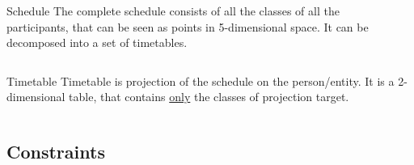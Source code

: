 \begin{frame}
  \begin{columns}
    \begin{column}{4cm}
      \begin{block}{Schedule}
        The complete schedule consists of all the classes of all the participants,
        that can be seen as points in 5-dimensional space. It can be decomposed
        into a set of \alert{timetables}.
      \end{block}
    \end{column}
    \begin{column}{7cm}
    \end{column}
  \end{columns}
\end{frame}

\begin{frame}
  \begin{block}{Timetable}
    Timetable is projection of the schedule on the person/entity.
    It is a 2-dimensional table, that contains \underline{only} the classes
    of projection target.
  \end{block}
  \begin{columns}
    \begin{column}{.5\textwidth}
      \centering
      
    \end{column}
    \begin{column}{.5\textwidth}
      \centering
      
    \end{column}
  \end{columns}
\end{frame}

\subsection{Constraints}

